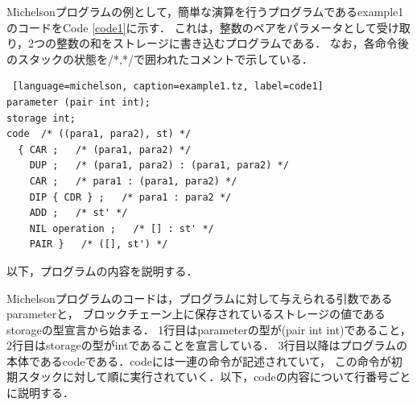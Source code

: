 \documentclass{kuisthesis}
\begin{document}
Michelsonプログラムの例として，簡単な演算を行うプログラムであるexample1のコードをCode \ref{code1}に示す．
これは，整数のペアをパラメータとして受け取り，2つの整数の和をストレージに書き込むプログラムである．
なお，各命令後のスタックの状態を/*,*/で囲われたコメントで示している．
\begin{lstlisting} [language=michelson, caption=example1.tz, label=code1]
parameter (pair int int); 
storage int;
code  /* ((para1, para2), st) */
  { CAR ;   /* (para1, para2) */
    DUP ;   /* (para1, para2) : (para1, para2) */
    CAR ;   /* para1 : (para1, para2) */
    DIP { CDR } ;   /* para1 : para2 */
    ADD ;   /* st' */
    NIL operation ;   /* [] : st' */
    PAIR }   /* ([], st') */
\end{lstlisting}

以下，プログラムの内容を説明する．

Michelsonプログラムのコードは，プログラムに対して与えられる引数であるparameterと，
ブロックチェーン上に保存されているストレージの値であるstorageの型宣言から始まる．
1行目はparameterの型が(pair int int)であること，2行目はstorageの型がintであることを宣言している．
3行目以降はプログラムの本体であるcodeである．codeには一連の命令が記述されていて，
この命令が初期スタックに対して順に実行されていく．以下，codeの内容について行番号ごとに説明する．
\end{document}
